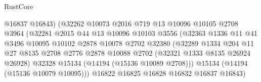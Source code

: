 \begin{lexlean}{RustCore}
\begin{coremodule}
                                        @16837
                                        @16843)
                                      (@32262
                                        @10073
                                        @2016
                                        @719
                                        @13
                                        @10096
                                        @10105
                                        @2708
                                        @3964
                                        (@32281
                                          @2015
                                          @44
                                          @13
                                          @10096
                                          @10103
                                          @3556
                                          (@32363
                                            @1336
                                            @11
                                            @41
                                            @3496
                                            @10095
                                            @10102
                                            @2878
                                            @10078
                                            @2702
                                            @32380
                                            (@32289
                                              @1334
                                              @204
                                              @11
                                              @27
                                              @8135
                                              @2708
                                              @2776
                                              @2878
                                              @10088
                                              @2702
                                              (@32321 @1333 @8135 @26924 @26928)
                                              @32328
                                              @15134
                                              (@14194 (@15136 @10089 @2708)))
                                            @15134
                                            (@14194 (@15136 @10079 @10095)))
                                          @16822
                                          @16825
                                          @16828
                                          @16832
                                          @16837
                                          @16843)

\end{coremodule}
\end{lexlean}
